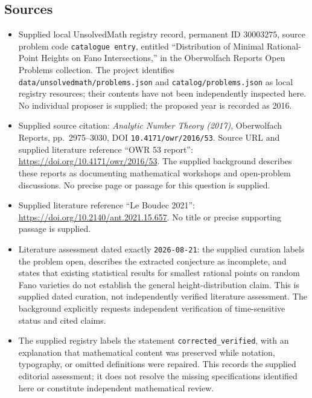 \documentclass[11pt]{article}
\begin{document}
\subsection{Sources}
\begin{itemize}
\item Supplied local UnsolvedMath registry record, permanent ID \(30003275\), source problem code \texttt{catalogue entry}, entitled ``Distribution of Minimal Rational-Point Heights on Fano Intersections,'' in the Oberwolfach Reports Open Problems collection. The project identifies \texttt{data/unsolvedmath/problems.json} and \texttt{catalog/problems.json} as local registry resources; their contents have not been independently inspected here. No individual proposer is supplied; the proposed year is recorded as 2016.
\item Supplied source citation: \emph{Analytic Number Theory (2017)}, Oberwolfach Reports, pp.\ 2975--3030, DOI \texttt{10.4171/owr/2016/53}. Source URL and supplied literature reference ``OWR 53 report'': \url{https://doi.org/10.4171/owr/2016/53}. The supplied background describes these reports as documenting mathematical workshops and open-problem discussions. No precise page or passage for this question is supplied.
\item Supplied literature reference ``Le Boudec 2021'': \url{https://doi.org/10.2140/ant.2021.15.657}. No title or precise supporting passage is supplied.
\item Literature assessment dated exactly \texttt{2026-08-21}: the supplied curation labels the problem open, describes the extracted conjecture as incomplete, and states that existing statistical results for smallest rational points on random Fano varieties do not establish the general height-distribution claim. This is supplied dated curation, not independently verified literature assessment. The background explicitly requests independent verification of time-sensitive status and cited claims.
\item The supplied registry labels the statement \texttt{corrected\_verified}, with an explanation that mathematical content was preserved while notation, typography, or omitted definitions were repaired. This records the supplied editorial assessment; it does not resolve the missing specifications identified here or constitute independent mathematical review.
\end{itemize}
\end{document}
